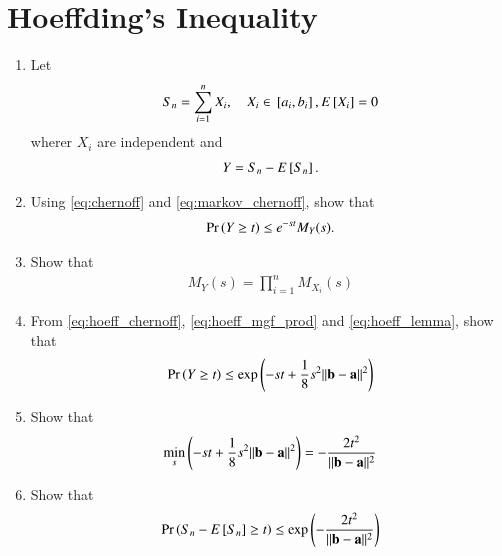 \documentclass[journal,12pt,twocolumn]{IEEEtran}
\renewcommand\thesection{\arabic{section}}
\begin{document}
\section{Hoeffding's Inequality}
\begin{enumerate}[label=\thesection.\arabic*,ref=\thesection.\theenumi]
\item Let 
\begin{align}
S_n=\sum_{i=1}^{n} X_i, \quad X_i \in {}\left[a_i,b_i\right], E{}\left[X_i\right]  = 0
\end{align}
%
wherer $X_i$ are independent and 
\begin{align}
Y = S_n- E{}\left[S_n\right].
\end{align}
%
\item Using \eqref{eq:chernoff} and \eqref{eq:markov_chernoff}, show that 
\begin{align}
\label{eq:hoeff_chernoff}
\Pr\left(Y \ge t\right) \le e^{-st} M_{Y}(s).
\end{align}
\item Show that 
\begin{align}
\label{eq:hoeff_mgf_prod}
M_{Y}(s)= \prod_{i=1}^{n}M_{X_i}(s)
\end{align}
\item From \eqref{eq:hoeff_chernoff}, \eqref{eq:hoeff_mgf_prod} and 
\eqref{eq:hoeff_lemma}, show that 
\begin{align}
\label{eq:hoeff_mgf_prod}
\Pr\left(Y \ge t\right) \le \exp\left(-st+\frac{1}{8}s^2\lVert\mathbf{b}-\mathbf{a}\rVert^2\right)
\end{align}
\item Show that 
\begin{align}
\label{eq:hoeff_min_ineq}
\min_{s}\left(-st+\frac{1}{8}s^2\lVert\mathbf{b}-\mathbf{a}\rVert^2\right) = -\frac{2t^2}{\lVert\mathbf{b}-\mathbf{a}\rVert^2}
\end{align}
\item Show that 
\begin{align}
\label{eq:hoeff_ineq}
\Pr\left(S_n- E{}\left[S_n\right] \ge t\right) \le \exp\left(-\frac{2t^2}{\lVert\mathbf{b}-\mathbf{a}\rVert^2}\right)
\end{align}
\end{enumerate}
\end{document}
